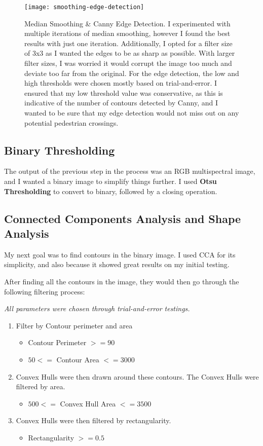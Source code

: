 \documentclass{article}  %
\begin{document}
	\begin{figure}[H]
		\centering
		\texttt{[image: smoothing-edge-detection]}
		\caption{Median Smoothing \& Canny Edge Detection. I experimented with multiple iterations of median smoothing, however I found the best results with just one iteration. Additionally, I opted for a filter size of 3x3 as I wanted the edges to be as sharp as possible. With larger filter sizes, I was worried it would corrupt the image too much and deviate too far from the original. For the edge detection, the low and high thresholds were chosen mostly based on trial-and-error. I ensured that my low threshold value was conservative, as this is indicative of the number of contours detected by Canny, and I wanted to be sure that my edge detection would not miss out on any potential pedestrian crossings.}
	\end{figure}
	
	\subsection{Binary Thresholding}
	
	The output of the previous step in the process was an RGB multispectral image, and I wanted a binary image to simplify things further. I used \textbf{Otsu Thresholding} to convert to binary, followed by a closing operation.
	
	\subsection{Connected Components Analysis and Shape Analysis}
	
	My next goal was to find contours in the binary image. I used CCA for its simplicity, and also because it showed great results on my initial testing.
	
	After finding all the contours in the image, they would then go through the following filtering process:
	
	\emph{All parameters were chosen through trial-and-error testings.}
	
	\begin{enumerate}
		\item Filter by Contour perimeter and area
		\begin{itemize}
			\item Contour Perimeter $>= 90$
			\item $50 <= $ Contour Area $ <= 3000$
		\end{itemize}
		\item Convex Hulls were then drawn around these contours. The Convex Hulls were filtered by area.
		\begin{itemize}
			\item $500 <= $ Convex Hull Area $ <= 3500$
		\end{itemize}
		\item Convex Hulls were then filtered by rectangularity.
		\begin{itemize}
			\item Rectangularity $>= 0.5$
		\end{itemize}
	\end{enumerate}
	
\end{document}
